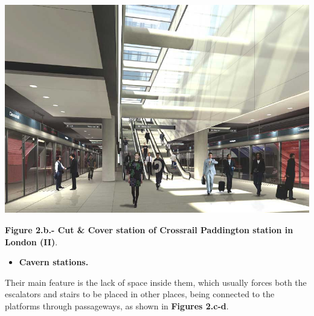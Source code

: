 \documentclass{article}
\begin{document}
\begin{mdcenter}%

\noindent{}\includegraphics[keepaspectratio=true,width=\dimmin{}{\dimwidth{0.50}}]{images/Fig-2.b}{}%
\end{mdcenter}%

\begin{mdcenter}%

\noindent{}\textbf{Figure 2.b.- Cut \& Cover station of Crossrail Paddington station in London (II)}.%
\end{mdcenter}%

\begin{itemize}[noitemsep,topsep=\mdcompacttopsep]%

\item{}\textbf{Cavern stations.}%
\end{itemize}%

\noindent{}Their main feature is the lack of space inside them, which usually forces both 
the escalators and stairs to be placed in other places, being connected to the 
platforms through passageways, as shown in \textbf{Figures 2.c-d}.%
\end{document}
